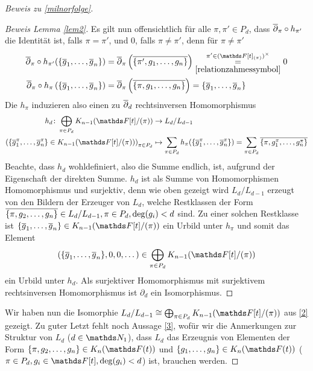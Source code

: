 \documentclass[ngerman,fontsize=11pt, paper=a4, parskip=half, titlepage=true, toc=bib]{scrartcl}
\begin{document}
\begin{proof}[Beweis zu \ref{milnorfolge}]
\begin{proof}[Beweis Lemma \ref{lem2}]
    Es gilt nun offensichtlich für alle $\pi,\pi'\in P_d$, 
    dass $\overline\partial_\pi\circ h_{\pi'}$ die Identität ist, 
    falls $\pi=\pi'$, und $0$, falls $\pi\neq\pi'$,
    denn für $\pi\neq\pi'$
    \begin{align*}
      \ov\partial_\pi\circ h_{\pi'}(\{\ov g_1,\dotsc,\ov g_n\})
      &= \ov\partial_\pi\left( \ov{\{\pi', g_1,\dotsc, g_n\}} \right)
        \overset{\pi'\in(\F[t]_{(\pi)})^\times}{
        \underset{\ref{relationzahmessymbol}}{=}}
        0\\
      \ov\partial_\pi\circ h_{\pi}\left( \{\ov g_1,\dotsc,\ov g_n\} \right)
      &= \ov\partial_\pi\left( \ov{\{\pi, g_1,\dotsc, g_n\}} \right)
      = \{\ov g_1,\dotsc,\ov g_n\}
    \end{align*}
    Die $h_\pi$ induzieren also einen zu
    $\overline\partial_d$ rechtsinversen Homomorphismus
    \begin{align*}
      h_d\colon \bigoplus_{\pi\in P_d}\K_{n-1}(\Ftpi)
      &\to L_d/L_{d-1}\\
      \left(
      \{\ov g_1^\pi,\dotsc,\ov g_n^\pi\}\in\K_{n-1}(\Ftpi)
      \right)_{\pi\in P_d}
      &\mapsto 
        \sum_{\pi\in P_d} h_\pi(\{\ov g_1^\pi,\dotsc,\ov g_n^\pi\}) 
        = \sum_{\pi\in P_d} \ov{\{\pi, g_1^\pi,\dotsc,g_n^\pi\}}
    \end{align*}
    Beachte, dass $h_d$ wohldefiniert, also die Summe endlich, ist,
    aufgrund der Eigenschaft der direkten Summe.
    $h_d$ ist als Summe von Homomorphismen Homomorphismus und
    surjektiv, denn wie oben gezeigt wird $L_d/L_{d-1}$ erzeugt von
    den Bildern der Erzeuger von $L_d$, welche Restklassen der Form 
    $\overline{\{\pi,g_2,\dotsc,g_n\}}\in L_d/L_{d-1}, \pi\in
    P_d,\deg(g_i)<d$ sind.
    Zu einer solchen Restklasse ist $\{\ov g_1,\dotsc,\ov
    g_n\}\in\K_{n-1}(\Ftpi)$ ein Urbild unter $h_\pi$
    und somit das Element
    \begin{gather*}
      \left(
      \{\ov g_1,\dotsc,\ov g_n\},%
      0, 0,\dotsc %
      \right)%
      \in \bigoplus_{\pi\in P_d}\K_{n-1}(\Ftpi)
    \end{gather*}
    ein Urbild unter $h_d$.
    Als surjektiver Homomorphismus mit surjektivem
    rechtsinversen Homomorphismus ist $\partial_d$ ein Isomorphismus.
  \end{proof}

  Wir haben nun die Isomorphie $L_d/L_{d-1}\cong \bigoplus_{\pi\in
    P_d}\K_{n-1}(\Ftpi)$ aus \ref{2} gezeigt.
  Zu guter Letzt fehlt noch Aussage \ref{3}, wofür wir die Anmerkungen
  zur Struktur von $L_d$ ($d\in\N_1$), dass $L_d$ das Erzeugnis von
  Elementen der Form
  $\{\pi,g_2,\dotsc,g_n\}\in\KnFt$ und $\{g_1,\dotsc,g_n\}\in\KnFt$
  ($\pi\in P_d,g_i\in\F[t],\deg(g_i)<d$) ist,
  brauchen werden.


\end{proof}
\end{document}
